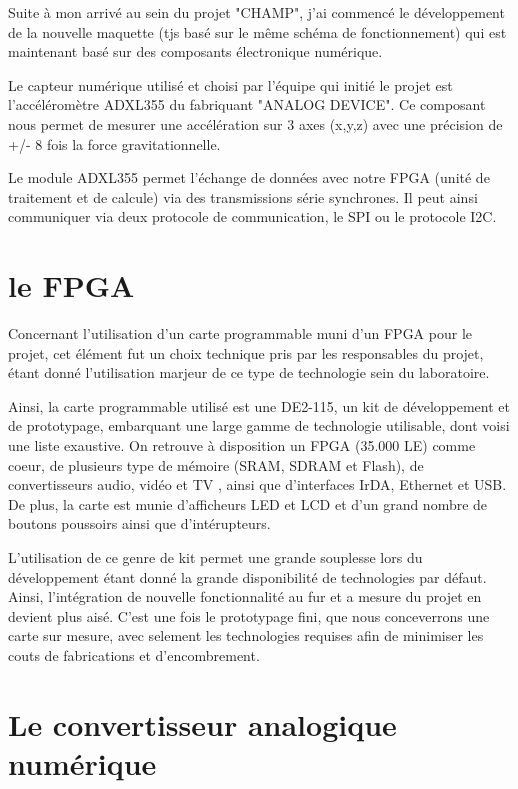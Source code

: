 \documentclass[french,a4paper,12pt]{report}
\begin{document}
 
Suite à mon arrivé au sein du projet "CHAMP", j'ai commencé le développement de la nouvelle maquette (tjs basé sur le même schéma de fonctionnement) qui est maintenant basé sur des composants électronique numérique.
 
Le capteur numérique utilisé et choisi par l'équipe qui initié le projet est l'accéléromètre ADXL355 du fabriquant "ANALOG DEVICE". Ce composant nous permet de mesurer une accélération sur 3 axes (x,y,z) avec une précision de +/- 8 fois la force gravitationnelle.
 
Le module ADXL355 permet l'échange de données avec notre FPGA (unité de traitement et de calcule) via des transmissions série synchrones. Il peut ainsi communiquer via deux protocole de communication, le SPI ou le protocole I2C.
			
			\section{le FPGA}
			
			Concernant l'utilisation d'un carte programmable muni d'un FPGA pour le projet, cet élément fut un choix technique pris par les responsables du projet, étant donné l'utilisation marjeur de ce type de technologie sein du laboratoire.
			
			Ainsi, la carte programmable utilisé est une DE2-115, un kit de développement et de prototypage, embarquant une large gamme de technologie utilisable, dont voisi une liste exaustive. On retrouve à disposition un FPGA (35.000 LE) comme coeur, de plusieurs type de mémoire (SRAM, SDRAM et Flash), de convertisseurs audio, vidéo et TV , ainsi que d'interfaces IrDA, Ethernet et USB. De plus, la carte est munie d'afficheurs LED et LCD et d'un grand nombre de boutons poussoirs ainsi que d'intérupteurs.
			
			L'utilisation de ce genre de kit permet une grande souplesse lors du développement étant donné la grande disponibilité de technologies par défaut. Ainsi, l'intégration de nouvelle fonctionnalité au fur et a mesure du projet en devient plus aisé. C'est une fois le prototypage fini, que nous conceverrons une carte sur mesure, avec selement les technologies requises afin de minimiser les couts de fabrications et d'encombrement.
			
			\section{Le convertisseur analogique numérique}
			
\end{document}
